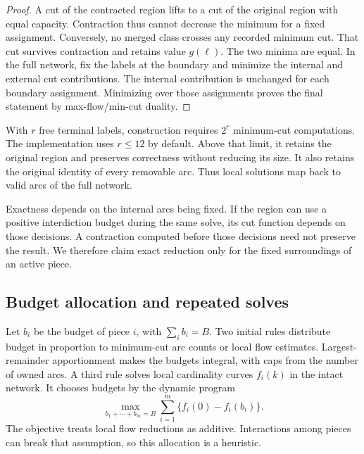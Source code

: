 \documentclass[review,onefignum,onetabnum]{siamart171218}
\begin{document}
\begin{proof}
A cut of the contracted region lifts to a cut of the original region with equal capacity.
Contraction thus cannot decrease the minimum for a fixed assignment.
Conversely, no merged class crosses any recorded minimum cut.
That cut survives contraction and retains value $g(\ell)$.
The two minima are equal.
In the full network, fix the labels at the boundary and minimize the internal and external cut contributions.
The internal contribution is unchanged for each boundary assignment.
Minimizing over those assignments proves the final statement by max-flow/min-cut duality.
\end{proof}

With $r$ free terminal labels, construction requires $2^r$ minimum-cut computations.
The implementation uses $r\leq12$ by default.
Above that limit, it retains the original region and preserves correctness without reducing its size.
It also retains the original identity of every removable arc.
Thus local solutions map back to valid arcs of the full network.

Exactness depends on the internal arcs being fixed.
If the region can use a positive interdiction budget during the same solve, its cut function depends on those decisions.
A contraction computed before those decisions need not preserve the result.
We therefore claim exact reduction only for the fixed surroundings of an active piece.

\subsection{Budget allocation and repeated solves}
Let $b_i$ be the budget of piece $i$, with $\sum_i b_i=B$.
Two initial rules distribute budget in proportion to minimum-cut arc counts or local flow estimates.
Largest-remainder apportionment makes the budgets integral, with caps from the number of owned arcs.
A third rule solves local cardinality curves $f_i(k)$ in the intact network.
It chooses budgets by the dynamic program
\begin{equation}\label{eq:allocation}
 \max_{b_1+\cdots+b_m=B}\sum_{i=1}^m\{f_i(0)-f_i(b_i)\}.
\end{equation}
The objective treats local flow reductions as additive.
Interactions among pieces can break that assumption, so this allocation is a heuristic.
\end{document}
